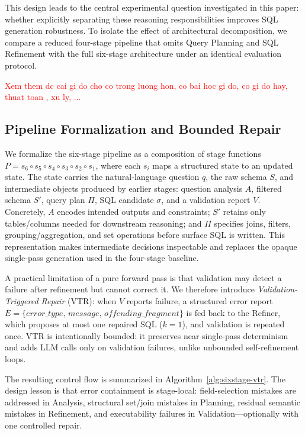 \documentclass{svproc}
\begin{document}
This design leads to the central experimental question investigated in this paper: whether explicitly separating these reasoning responsibilities improves SQL generation robustness. To isolate the effect of architectural decomposition, we compare a reduced four-stage pipeline that omits Query Planning and SQL Refinement with the full six-stage architecture under an identical evaluation protocol.

\textcolor{red}{Xem them dc cai gi do cho co trong luong hon, co bai hoc gi do, co gi do hay, thuat toan , xu ly, ...}

{\color{red}
\subsection{Pipeline Formalization and Bounded Repair}
\label{subsec:formal-vtr}

We formalize the six-stage pipeline as a composition of stage functions
\(P = s_6 \circ s_5 \circ s_4 \circ s_3 \circ s_2 \circ s_1\),
where each \(s_i\) maps a structured state to an updated state.
The state carries the natural-language question \(q\), the raw schema \(S\),
and intermediate objects produced by earlier stages:
question analysis \(A\), filtered schema \(S'\), query plan \(\Pi\),
SQL candidate \(\sigma\), and a validation report \(V\).
Concretely, \(A\) encodes intended outputs and constraints;
\(S'\) retains only tables/columns needed for downstream reasoning;
and \(\Pi\) specifies joins, filters, grouping/aggregation, and set operations
before surface SQL is written.
This representation makes intermediate decisions inspectable and replaces
the opaque single-pass generation used in the four-stage baseline.

A practical limitation of a pure forward pass is that validation may detect
a failure after refinement but cannot correct it.
We therefore introduce \emph{Validation-Triggered Repair} (VTR):
when \(V\) reports failure, a structured error report
\(E=\{\textit{error\_type},\,\textit{message},\,\textit{offending\_fragment}\}\)
is fed back to the Refiner, which proposes at most one repaired SQL
(\(k=1\)), and validation is repeated once.
VTR is intentionally bounded: it preserves near single-pass determinism and
adds LLM calls only on validation failures, unlike unbounded
self-refinement loops.

The resulting control flow is summarized in Algorithm~\ref{alg:sixstage-vtr}.
The design lesson is that error containment is stage-local:
field-selection mistakes are addressed in Analysis, structural set/join
mistakes in Planning, residual semantic mistakes in Refinement, and
executability failures in Validation---optionally with one controlled repair.

}
\end{document}
